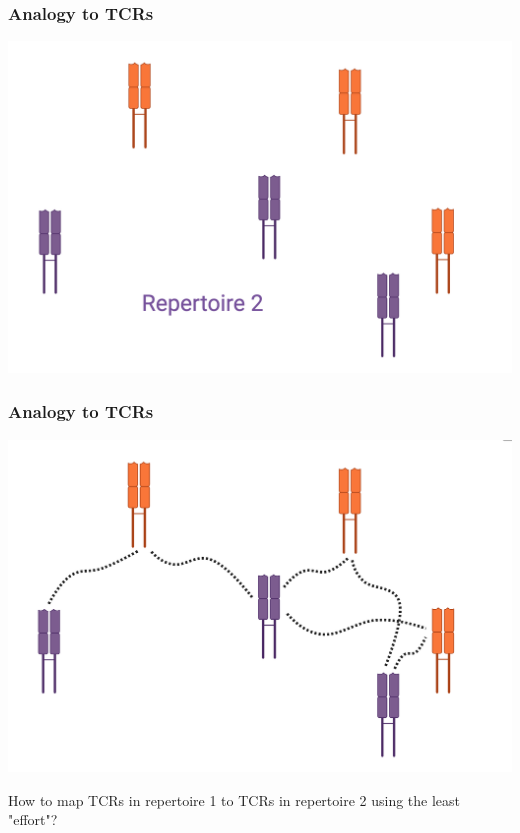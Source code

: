 \documentclass[mathserif,compress,xcolor={dvipsnames}]{beamer}
\renewcommand\;{\,}
\begin{document}
\begin{frame}\frametitle{Analogy to TCRs}
\begin{center}
\includegraphics[width=\linewidth]{Images/TCR_soldier_rep_2.png}
\end{center}
\end{frame}

\begin{frame}\frametitle{Analogy to TCRs}
\begin{center}
\includegraphics[width=0.9\linewidth]{Images/TCR_soldier_mapping.png}
\end{center}
How to map TCRs in {\color{Orange} repertoire 1} to TCRs in {\color{Purple} repertoire 2} using the least "effort"?
\end{frame}
\end{document}
